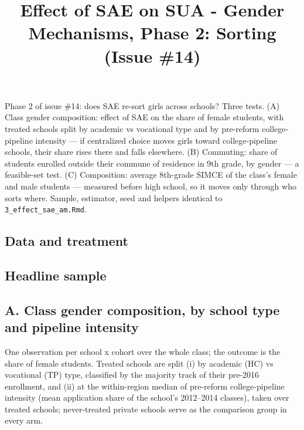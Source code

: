 \documentclass[
]{article}
\title{Effect of SAE on SUA - Gender Mechanisms, Phase 2: Sorting (Issue
\#14)}
\author{}
\date{\vspace{-2.5em}}
\begin{document}
\maketitle

Phase 2 of issue \#14: does SAE re-sort girls across schools? Three
tests. (A) Class gender composition: effect of SAE on the share of
female students, with treated schools split by academic vs vocational
type and by pre-reform college-pipeline intensity --- if centralized
choice moves girls toward college-pipeline schools, their share rises
there and falls elsewhere. (B) Commuting: share of students enrolled
outside their commune of residence in 9th grade, by gender --- a
feasible-set test. (C) Composition: average 8th-grade SIMCE of the
class's female and male students --- measured before high school, so it
moves only through who sorts where. Sample, estimator, seed and helpers
identical to \texttt{3\_effect\_sae\_am.Rmd}.

\hypertarget{data-and-treatment}{%
\subsection{Data and treatment}\label{data-and-treatment}}

\hypertarget{headline-sample}{%
\subsection{Headline sample}\label{headline-sample}}

\hypertarget{a.-class-gender-composition-by-school-type-and-pipeline-intensity}{%
\subsection{A. Class gender composition, by school type and pipeline
intensity}\label{a.-class-gender-composition-by-school-type-and-pipeline-intensity}}

One observation per school x cohort over the whole class; the outcome is
the share of female students. Treated schools are split (i) by academic
(HC) vs vocational (TP) type, classified by the majority track of their
pre-2016 enrollment, and (ii) at the within-region median of pre-reform
college-pipeline intensity (mean application share of the school's
2012--2014 classes), taken over treated schools; never-treated private
schools serve as the comparison group in every arm.
\end{document}
